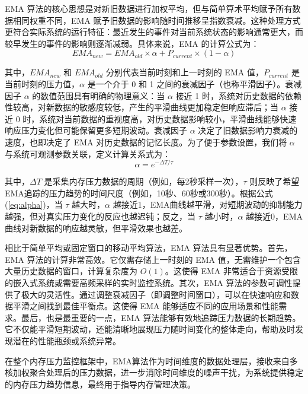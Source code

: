 EMA 算法的核心思想是对新旧数据进行加权平均，但与简单算术平均赋予所有数据相同权重不同，EMA 赋予旧数据的影响随时间推移呈指数衰减。这种处理方式更符合实际系统的运行特征：最近发生的事件对当前系统状态的影响通常更大，而较早发生的事件的影响则逐渐减弱。具体来说，EMA 的计算公式为：
\begin{equation}
    EMA_{new} = EMA_{old} \times \alpha + P_{current} \times (1 - \alpha)
    \label{eq:EMA}
\end{equation}

其中，\(EMA_{new}\) 和 \(EMA_{old}\) 分别代表当前时刻和上一时刻的 EMA 值，\(P_{current}\) 是当前时刻的压力值，\(\alpha\) 是一个介于 0 和 1 之间的衰减因子（也称平滑因子）。衰减因子 \(\alpha\) 的数值范围具有明确的物理意义：当 \(\alpha\) 接近 1 时，系统对历史数据的依赖性较高，对新数据的敏感度较低，产生的平滑曲线更加稳定但响应滞后；当 \(\alpha\) 接近 0 时，系统对当前数据的重视度高，对历史数据影响较小，平滑曲线能够快速响应压力变化但可能保留更多短期波动。衰减因子 \(\alpha\) 决定了旧数据影响力衰减的速度，也即决定了 EMA 对历史数据的记忆长度。为了便于参数设置，我们将 \(\alpha\) 与系统可观测参数关联，定义计算关系式为：
\begin{equation}
\alpha = e^{-\Delta T / \tau}
\label{eq:alpha}
\end{equation}

其中，\(\Delta T\) 是采集内存压力数据的周期（例如，每2秒采样一次），\(\tau\) 则反映了希望EMA追踪的压力趋势的时间尺度（例如，10秒、60秒或300秒）。根据公式(\ref{eq:alpha})，当 \(\tau\) 越大时，\(\alpha\) 越接近1，EMA曲线越平滑，对短期波动的抑制能力越强，但对真实压力变化的反应也越迟钝；反之，当 \(\tau\) 越小时，\(\alpha\) 越接近0，EMA曲线对新数据的响应越灵敏，但平滑效果也越差。

相比于简单平均或固定窗口的移动平均算法，EMA 算法具有显著优势。首先，EMA 算法的计算非常高效。它仅需存储上一时刻的 EMA 值，无需维护一个包含大量历史数据的窗口，计算复杂度为 \(O(1)\)。这使得 EMA 非常适合于资源受限的嵌入式系统或需要高频采样的实时监控系统。其次，EMA 算法的参数可调性提供了极大的灵活性。通过调整衰减因子（即调整时间窗口），可以在快速响应和数据平滑之间找到最佳平衡点。这使得 EMA 能够适应不同的应用场景和性能需求。最后，也是最重要的一点，EMA 算法能够有效地追踪压力数据的长期趋势。它不仅能平滑短期波动，还能清晰地展现压力随时间变化的整体走向，帮助及时发现潜在的性能瓶颈或系统异常。

在整个内存压力监控框架中，EMA算法作为时间维度的数据处理层，接收来自多核加权聚合处理后的压力数据，进一步消除时间维度的噪声干扰，为系统提供稳定的内存压力趋势信息，最终用于指导内存管理决策。

